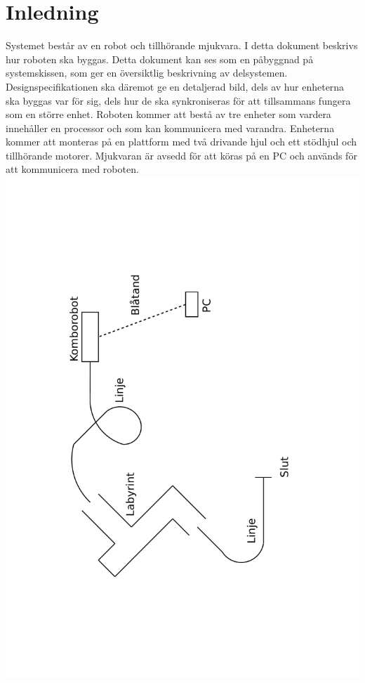 \section{Inledning}
Systemet består av en robot och tillhörande mjukvara. I detta dokument beskrivs hur roboten ska byggas. Detta dokument kan ses som en påbyggnad på systemskissen, som ger en översiktlig beskrivning av delsystemen. Designspecifikationen ska däremot ge en detaljerad bild, dels av hur enheterna ska byggas var för sig, dels hur de ska synkroniseras för att tillsammans fungera som en större enhet.
Roboten kommer att bestå av tre enheter som vardera innehåller en processor och som kan kommunicera med varandra. 
Enheterna kommer att monteras på en plattform med två drivande hjul och ett stödhjul och tillhörande motorer.
Mjukvaran är avsedd för att köras på en PC och används för att kommunicera med roboten.
\includegraphics[angle=270,scale=0.5]{bilder/Oversikt.pdf}